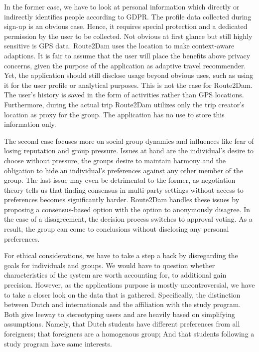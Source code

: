 \documentclass[11pt,a4paper,oneside]{article}
\begin{document}
In the former case, we have to look at personal information which directly or indirectly identifies people according to GDPR. The profile data collected during sign-up is an obvious case. Hence, it requires special protection and a dedicated permission by the user to be collected. Not obvious at first glance but still highly sensitive is GPS data. Route2Dam uses the location to make context-aware adaptions. It is fair to assume that the user will place the benefits above privacy concerns, given the purpose of the application as adaptive travel recommender. Yet, the application should still disclose usage beyond obvious uses, such as using it for the user profile or analytical purposes. This is not the case for Route2Dam. The user's history is saved in the form of activities rather than GPS locations. Furthermore, during the actual trip Route2Dam utilizes only the trip creator's location as proxy for the group. The application has no use to store this information only.

The second case focuses more on social group dynamics and influences like fear of losing reputation and group pressure.\cite{asch_OpinionsSocialPressure_1955} Issues at hand are the individual's desire to choose without pressure, the groups desire to maintain harmony and the obligation to hide an individual's preferences against any other member of the group. The last issue may even be detrimental to the former, as negotiation theory tells us that finding consensus in multi-party settings without access to preferences becomes significantly harder.\cite{baarslag_ValueInformationAutomated_2017a} Route2Dam handles these issues by proposing a consensus-based option with the option to anonymously disagree. In the case of a disagreement, the decision process switches to approval voting. As a result, the group can come to conclusions without disclosing any personal preferences.  

For ethical considerations, we have to take a step a back by disregarding the goals for individuals and groups. We would have to question whether characteristics of the system are worth accounting for, to additional gain precision. However, as the applications purpose is mostly uncontroversial, we have to take a closer look on the data that is gathered. Specifically, the distinction between Dutch and internationals and the affiliation with the study program. Both give leeway to stereotyping users and are heavily based on simplifying assumptions. Namely, that Dutch students have different preferences from all foreigners; that foreigners are a homogenous group; And that students following a study program have same interests.  
\end{document}

